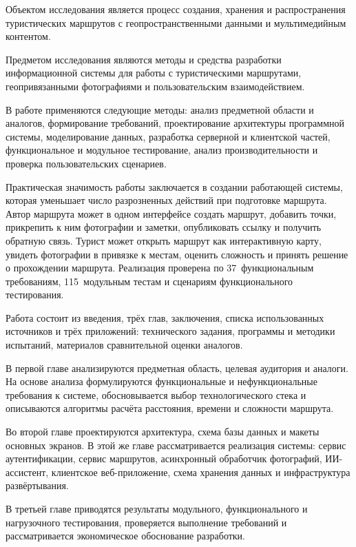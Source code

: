 Объектом исследования является процесс создания, хранения и распространения
туристических маршрутов с геопространственными данными и мультимедийным
контентом.

Предметом исследования являются методы и средства разработки информационной
системы для работы с туристическими маршрутами, геопривязанными фотографиями и
пользовательским взаимодействием.

В работе применяются следующие методы: анализ предметной области и аналогов,
формирование требований, проектирование архитектуры программной системы,
моделирование данных, разработка серверной и клиентской частей, функциональное и
модульное тестирование, анализ производительности и проверка пользовательских
сценариев.

Практическая значимость работы заключается в создании работающей системы,
которая уменьшает число разрозненных действий при подготовке маршрута. Автор
маршрута может в одном интерфейсе создать маршрут, добавить точки, прикрепить к
ним фотографии и заметки, опубликовать ссылку и получить обратную связь. Турист
может открыть маршрут как интерактивную карту, увидеть фотографии в привязке к
местам, оценить сложность и принять решение о прохождении маршрута. Реализация
проверена по 37~функциональным требованиям, 115~модульным тестам и сценариям
функционального тестирования.

Работа состоит из введения, трёх глав, заключения, списка использованных
источников и трёх приложений: технического задания, программы и методики
испытаний, материалов сравнительной оценки аналогов.

В первой главе анализируются предметная область, целевая аудитория и аналоги.
На основе анализа формулируются функциональные и нефункциональные требования к
системе, обосновывается выбор технологического стека и описываются алгоритмы
расчёта расстояния, времени и сложности маршрута.

Во второй главе проектируются архитектура, схема базы данных и макеты основных
экранов. В этой же главе рассматривается реализация системы: сервис
аутентификации, сервис маршрутов, асинхронный обработчик фотографий,
ИИ-ассистент, клиентское веб-приложение, схема хранения данных и инфраструктура
развёртывания.

В третьей главе приводятся результаты модульного, функционального и
нагрузочного тестирования, проверяется выполнение требований и рассматривается
экономическое обоснование разработки.
